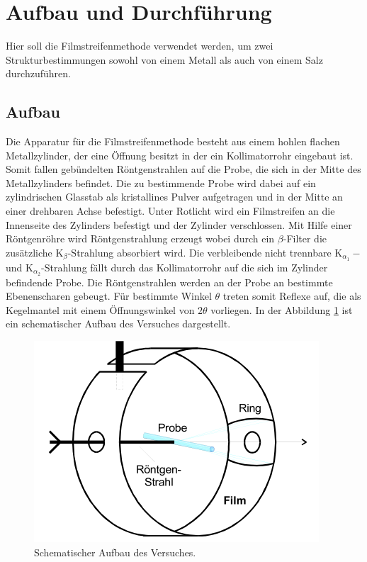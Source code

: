 \section{Aufbau und Durchführung}
\label{sec:Durchführung}
Hier soll die Filmstreifenmethode verwendet werden,
um zwei Strukturbestimmungen
sowohl von einem Metall als auch von
einem Salz durchzuführen.
\subsection{Aufbau}
\label{subsec:Aufbau}
Die Apparatur für die Filmstreifenmethode
besteht aus einem hohlen flachen Metallzylinder,
der eine Öffnung besitzt
in der ein Kollimatorrohr eingebaut ist.
Somit fallen gebündelten Röntgenstrahlen auf
 die Probe, die sich in
der Mitte des Metallzylinders befindet.
Die zu bestimmende Probe wird dabei auf ein
zylindrischen Glasstab
als kristallines Pulver aufgetragen und in der Mitte an einer drehbaren
Achse befestigt. Unter Rotlicht wird ein Filmstreifen an die Innenseite
des Zylinders befestigt und der Zylinder verschlossen.
Mit Hilfe einer Röntgenröhre wird Röntgenstrahlung erzeugt
wobei durch ein $\beta$-Filter die zusätzliche
$\mathrm{K}_\beta$-Strahlung absorbiert wird.
Die verbleibende nicht trennbare  $\mathrm{K}_{\alpha_1}-$
und $\mathrm{K}_{\alpha_2}$-Strahlung fällt durch das Kollimatorrohr
auf die sich im Zylinder befindende Probe. Die Röntgenstrahlen werden an
der Probe an bestimmte Ebenenscharen gebeugt. Für bestimmte Winkel $\theta$ treten
somit Reflexe auf, die als Kegelmantel mit einem Öffnungswinkel von $2\theta$
vorliegen. In der Abbildung \ref{fig:aufbau} ist ein schematischer Aufbau des Versuches dargestellt.
\begin{figure}
  \centering
  \includegraphics{Aufbau.PNG}
  \caption{Schematischer Aufbau des Versuches.}
  \label{fig:aufbau}
 \end{figure}
\FloatBarrier
